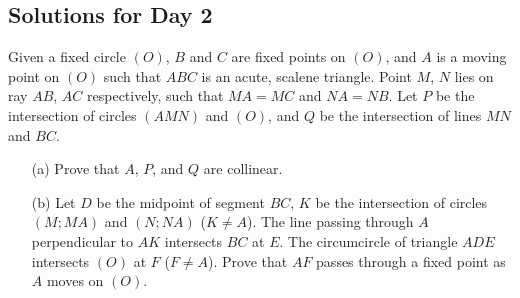 \documentclass[11pt]{article}
\theoremstyle{definition}
\begin{document}
    \newpage

    \subsection{Solutions for Day 2}

        \begin{problem}
            Given a fixed circle \((O)\), \(B\) and \(C\) are fixed points on \((O)\), and \(A\) is a moving point on \((O)\) such that \(ABC\) is an acute, scalene triangle. Point \(M\), \(N\) lies on ray \(AB\), \(AC\) respectively, such that \(MA = MC\) and \(NA = NB\). Let \(P\) be the intersection of circles \((AMN)\) and \((O)\), and \(Q\) be the intersection of lines \(MN\) and \(BC\).
            \begin{enumerate}
                \item[(a)] Prove that \(A\), \(P\), and \(Q\) are collinear.
                \item[(b)] Let \(D\) be the midpoint of segment \(BC\), \(K\) be the intersection of circles \((M;MA)\) and \((N;NA)\) (\(K \neq A\)). The line passing through \(A\) perpendicular to \(AK\) intersects \(BC\) at \(E\). The circumcircle of triangle \(ADE\) intersects \((O)\) at \(F\) (\(F \neq A\)). Prove that \(AF\) passes through a fixed point as \(A\) moves on \((O)\).
            \end{enumerate}
        \end{problem}
\end{document}
